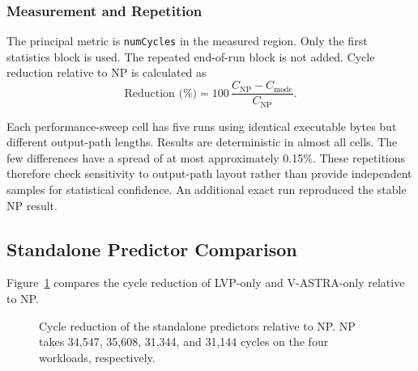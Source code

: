 \subsubsection{Measurement and Repetition}

The principal metric is \texttt{numCycles} in the measured region.
Only the first statistics block is used. The repeated end-of-run
block is not added. Cycle reduction relative to NP is calculated as
\[
  \text{Reduction (\%)} =
  100\,\frac{C_{\mathrm{NP}}-C_{\mathrm{mode}}}
  {C_{\mathrm{NP}}}.
\]

Each performance-sweep cell has five runs using identical executable
bytes but different output-path lengths. Results are deterministic
in almost all cells. The few differences have a spread of at most
approximately 0.15\%. These repetitions therefore check sensitivity
to output-path layout rather than provide independent samples for
statistical confidence. An additional exact run reproduced the stable
NP result.

\subsection{Standalone Predictor Comparison}
\label{subsec:standalone-predictor-performance}

Figure~\ref{tab:standalone-predictor-cycles} compares the cycle
reduction of LVP-only and V-ASTRA-only relative to NP.

\begin{figure}[H]
    \centering
    \caption{Cycle reduction of the standalone predictors relative to NP.
    NP takes 34,547, 35,608, 31,344, and 31,144 cycles on the four
    workloads, respectively.}
    \label{tab:standalone-predictor-cycles}
\end{figure}

